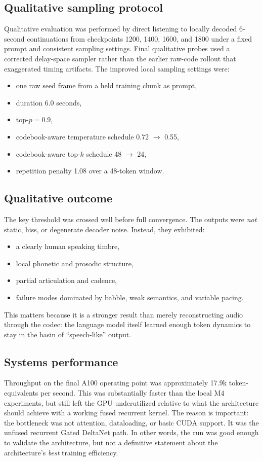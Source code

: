 \documentclass[11pt]{article}
\begin{document}
\subsection{Qualitative sampling protocol}
Qualitative evaluation was performed by direct listening to locally decoded 6-second continuations from checkpoints 1200, 1400, 1600, and 1800 under a fixed prompt and consistent sampling settings. Final qualitative probes used a corrected delay-space sampler rather than the earlier raw-code rollout that exaggerated timing artifacts. The improved local sampling settings were:
\begin{itemize}
    \item one raw seed frame from a held training chunk as prompt,
    \item duration 6.0 seconds,
    \item top-$p=0.9$,
    \item codebook-aware temperature schedule 0.72 $\rightarrow$ 0.55,
    \item codebook-aware top-$k$ schedule 48 $\rightarrow$ 24,
    \item repetition penalty 1.08 over a 48-token window.
\end{itemize}

\subsection{Qualitative outcome}
The key threshold was crossed well before full convergence. The outputs were \emph{not} static, hiss, or degenerate decoder noise. Instead, they exhibited:
\begin{itemize}
    \item a clearly human speaking timbre,
    \item local phonetic and prosodic structure,
    \item partial articulation and cadence,
    \item failure modes dominated by babble, weak semantics, and variable pacing.
\end{itemize}

This matters because it is a stronger result than merely reconstructing audio through the codec: the language model itself learned enough token dynamics to stay in the basin of ``speech-like'' output.

\subsection{Systems performance}
Throughput on the final A100 operating point was approximately 17.9k token-equivalents per second. This was substantially faster than the local M4 experiments, but still left the GPU underutilized relative to what the architecture should achieve with a working fused recurrent kernel. The reason is important: the bottleneck was not attention, dataloading, or basic CUDA support. It was the unfused recurrent Gated DeltaNet path. In other words, the run was good enough to validate the architecture, but not a definitive statement about the architecture's \emph{best} training efficiency.
\end{document}
